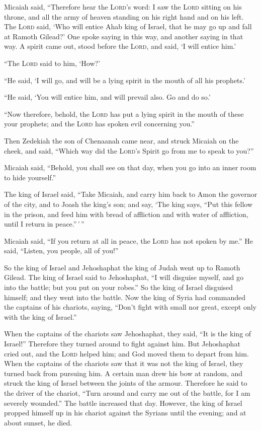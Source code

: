  Micaiah said, ``Therefore hear the \textsc{Lord}'s word:
I saw the \textsc{Lord} sitting on his throne, and all the army of
heaven standing on his right hand and on his left.  The
\textsc{Lord} said, `Who will entice Ahab king of Israel, that he may go
up and fall at Ramoth Gilead?' One spoke saying in this way, and another
saying in that way.  A spirit came out, stood before the
\textsc{Lord}, and said, `I will entice him.'

``The \textsc{Lord} said to him, `How?'

 ``He said, `I will go, and will be a lying spirit in the
mouth of all his prophets.'

``He said, `You will entice him, and will prevail also. Go and do so.'

 ``Now therefore, behold, the \textsc{Lord} has put a
lying spirit in the mouth of these your prophets; and the \textsc{Lord}
has spoken evil concerning you.''

 Then Zedekiah the son of Chenaanah came near, and struck
Micaiah on the cheek, and said, ``Which way did the \textsc{Lord}'s
Spirit go from me to speak to you?''

 Micaiah said, ``Behold, you shall see on that day, when
you go into an inner room to hide yourself.''

 The king of Israel said, ``Take Micaiah, and carry him
back to Amon the governor of the city, and to Joash the king's son;
 and say, `The king says, ``Put this fellow in the
prison, and feed him with bread of affliction and with water of
affliction, until I return in peace.''\,'\,''

 Micaiah said, ``If you return at all in peace, the
\textsc{Lord} has not spoken by me.'' He said, ``Listen, you people, all
of you!''

 So the king of Israel and Jehoshaphat the king of Judah
went up to Ramoth Gilead.  The king of Israel said to
Jehoshaphat, ``I will disguise myself, and go into the battle; but you
put on your robes.'' So the king of Israel disguised himself; and they
went into the battle.  Now the king of Syria had
commanded the captains of his chariots, saying, ``Don't fight with small
nor great, except only with the king of Israel.''

 When the captains of the chariots saw Jehoshaphat, they
said, ``It is the king of Israel!'' Therefore they turned around to
fight against him. But Jehoshaphat cried out, and the \textsc{Lord}
helped him; and God moved them to depart from him.  When
the captains of the chariots saw that it was not the king of Israel,
they turned back from pursuing him.  A certain man drew
his bow at random, and struck the king of Israel between the joints of
the armour. Therefore he said to the driver of the chariot, ``Turn
around and carry me out of the battle, for I am severely wounded.''
 The battle increased that day. However, the king of
Israel propped himself up in his chariot against the Syrians until the
evening; and at about sunset, he died.

